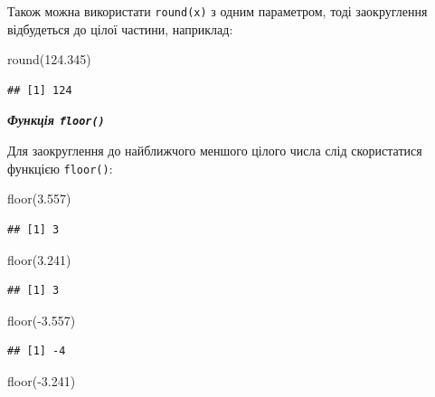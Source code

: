\documentclass[
]{book}
\newenvironment{Shaded}{\begin{snugshade}}{\end{snugshade}}
\newcommand{\FloatTok}[1]{\textcolor[rgb]{0.00,0.00,0.81}{#1}}
\newcommand{\FunctionTok}[1]{\textcolor[rgb]{0.00,0.00,0.00}{#1}}
\newcommand{\NormalTok}[1]{#1}
\newcommand{\SpecialCharTok}[1]{\textcolor[rgb]{0.00,0.00,0.00}{#1}}
\begin{document}
Також можна використати \texttt{round(x)} з одним параметром, тоді заокруглення відбудеться до цілої частини, наприклад:

\begin{Shaded}
\begin{Highlighting}[]
\FunctionTok{round}\NormalTok{(}\FloatTok{124.345}\NormalTok{)}
\end{Highlighting}
\end{Shaded}

\begin{verbatim}
## [1] 124
\end{verbatim}

\emph{\textbf{Функція \texttt{floor()}}}

Для заокруглення до найближчого меншого цілого числа слід скористатися функцією \texttt{floor()}:

\begin{Shaded}
\begin{Highlighting}[]
\FunctionTok{floor}\NormalTok{(}\FloatTok{3.557}\NormalTok{)}
\end{Highlighting}
\end{Shaded}

\begin{verbatim}
## [1] 3
\end{verbatim}

\begin{Shaded}
\begin{Highlighting}[]
\FunctionTok{floor}\NormalTok{(}\FloatTok{3.241}\NormalTok{)}
\end{Highlighting}
\end{Shaded}

\begin{verbatim}
## [1] 3
\end{verbatim}

\begin{Shaded}
\begin{Highlighting}[]
\FunctionTok{floor}\NormalTok{(}\SpecialCharTok{{-}}\FloatTok{3.557}\NormalTok{)}
\end{Highlighting}
\end{Shaded}

\begin{verbatim}
## [1] -4
\end{verbatim}

\begin{Shaded}
\begin{Highlighting}[]
\FunctionTok{floor}\NormalTok{(}\SpecialCharTok{{-}}\FloatTok{3.241}\NormalTok{)}
\end{Highlighting}
\end{Shaded}
\end{document}
